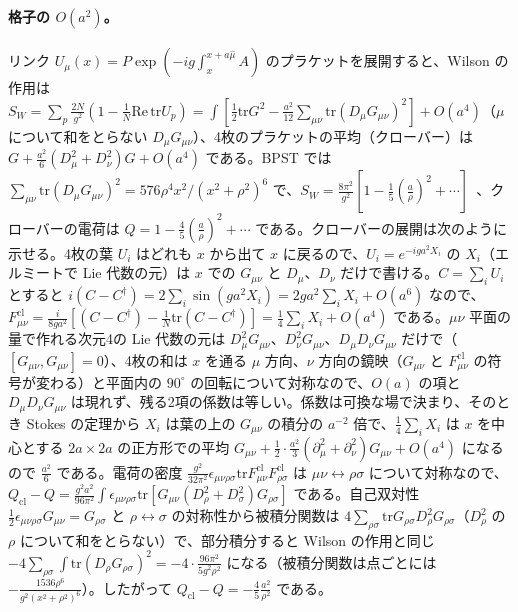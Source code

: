 \documentclass[a4paper,10pt]{ltjsarticle}
\newcommand{\tr}{\mathrm{tr}}
\begin{document}
\paragraph{格子の $O(a^2)$。}リンク $U_\mu(x)=P\exp(-ig\int_x^{x+a\hat\mu}A)$ のプラケットを展開すると、Wilson の作用は $S_W=\sum_p\frac{2N}{g^2}(1-\frac1N\mathrm{Re}\,\tr U_p)=\int[\frac12\tr G^2-\frac{a^2}{12}\sum_{\mu\nu}\tr(D_\mu G_{\mu\nu})^2]+O(a^4)$（$\mu$ について和をとらない $D_\mu G_{\mu\nu}$）、4枚のプラケットの平均（クローバー）は $G+\frac{a^2}6(D_\mu^2+D_\nu^2)G+O(a^4)$ である。BPST では $\sum_{\mu\nu}\tr(D_\mu G_{\mu\nu})^2=576\rho^4x^2/(x^2+\rho^2)^6$ で、$S_W=\frac{8\pi^2}{g^2}[1-\frac15(\frac a\rho)^2+\cdots]$~\cite{gpgsv94}、クローバーの電荷は $Q=1-\frac45(\frac a\rho)^2+\cdots$ である。クローバーの展開は次のように示せる。4枚の葉 $U_i$ はどれも $x$ から出て $x$ に戻るので、$U_i=e^{-iga^2X_i}$ の $X_i$（エルミートで Lie 代数の元）は $x$ での $G_{\mu\nu}$ と $D_\mu$、$D_\nu$ だけで書ける。$C=\sum_iU_i$ とすると $i(C-C^\dagger)=2\sum_i\sin(ga^2X_i)=2ga^2\sum_iX_i+O(a^6)$ なので、$F^{\mathrm{cl}}_{\mu\nu}=\frac i{8ga^2}[(C-C^\dagger)-\frac1N\tr(C-C^\dagger)]=\frac14\sum_iX_i+O(a^4)$ である。$\mu\nu$ 平面の量で作れる次元4の Lie 代数の元は $D_\mu^2G_{\mu\nu}$、$D_\nu^2G_{\mu\nu}$、$D_\mu D_\nu G_{\mu\nu}$ だけで（$[G_{\mu\nu},G_{\mu\nu}]=0$）、4枚の和は $x$ を通る $\mu$ 方向、$\nu$ 方向の鏡映（$G_{\mu\nu}$ と $F^{\mathrm{cl}}_{\mu\nu}$ の符号が変わる）と平面内の $90^\circ$ の回転について対称なので、$O(a)$ の項と $D_\mu D_\nu G_{\mu\nu}$ は現れず、残る2項の係数は等しい。係数は可換な場で決まり、そのとき Stokes の定理から $X_i$ は葉の上の $G_{\mu\nu}$ の積分の $a^{-2}$ 倍で、$\frac14\sum_iX_i$ は $x$ を中心とする $2a\times2a$ の正方形での平均 $G_{\mu\nu}+\frac12\cdot\frac{a^2}3(\partial_\mu^2+\partial_\nu^2)G_{\mu\nu}+O(a^4)$ になるので $\frac{a^2}6$ である。電荷の密度 $\frac{g^2}{32\pi^2}\epsilon_{\mu\nu\rho\sigma}\tr F^{\mathrm{cl}}_{\mu\nu}F^{\mathrm{cl}}_{\rho\sigma}$ は $\mu\nu\leftrightarrow\rho\sigma$ について対称なので、$Q_{\mathrm{cl}}-Q=\frac{g^2a^2}{96\pi^2}\int\epsilon_{\mu\nu\rho\sigma}\tr[G_{\mu\nu}(D_\rho^2+D_\sigma^2)G_{\rho\sigma}]$ である。自己双対性 $\frac12\epsilon_{\mu\nu\rho\sigma}G_{\mu\nu}=G_{\rho\sigma}$ と $\rho\leftrightarrow\sigma$ の対称性から被積分関数は $4\sum_{\rho\sigma}\tr G_{\rho\sigma}D_\rho^2G_{\rho\sigma}$（$D_\rho^2$ の $\rho$ について和をとらない）で、部分積分すると Wilson の作用と同じ $-4\sum_{\rho\sigma}\int\tr(D_\rho G_{\rho\sigma})^2=-4\cdot\frac{96\pi^2}{5g^2\rho^2}$ になる（被積分関数は点ごとには $-\frac{1536\rho^6}{g^2(x^2+\rho^2)^6}$）。したがって $Q_{\mathrm{cl}}-Q=-\frac45\frac{a^2}{\rho^2}$ である。
\end{document}
